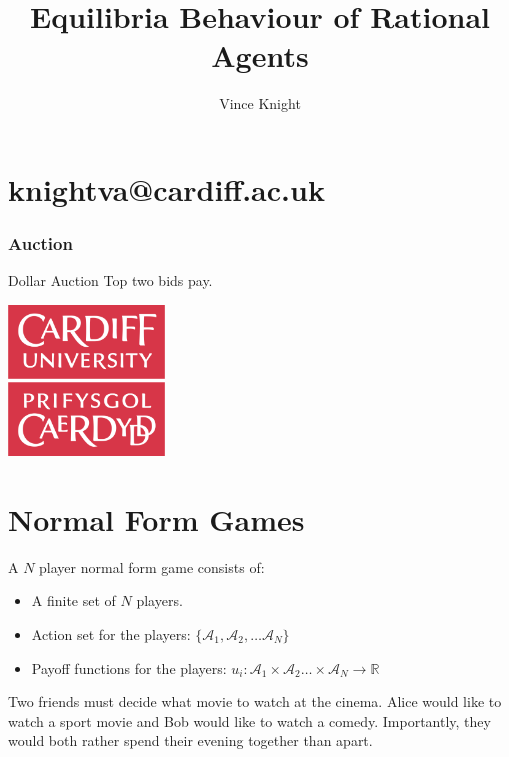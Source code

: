 \documentclass{beamer}              %
\title{Equilibria Behaviour of Rational Agents}
\author{Vince Knight}
\date{}
\begin{document}
\frame{
    \titlepage
}

\section{knightva@cardiff.ac.uk}

\begin{frame}
    \frametitle{Auction}
        \begin{alertblock}{Dollar Auction}
            \centering
                Top two bids pay.
        \end{alertblock}
\end{frame}

\begin{frame}
    \centering

    \includegraphics[height=4cm]{static/CUident_CMYK.png}

\end{frame}

\section{Normal Form Games}

\begin{frame}

    \begin{definition}
        A $N$ player normal form game consists of:

        \begin{itemize}
            \item A finite set of $N$ players.
            \item Action set for the players: $\{\mathcal{A}_1, \mathcal{A}_2, \dots \mathcal{A}_N\}$
            \item Payoff functions for the players: $u_i : \mathcal{A}_1 \times \mathcal{A}_2 \dots \times \mathcal{A}_N \to \mathbb{R}$
        \end{itemize}
    \end{definition}
\end{frame}

\begin{frame}
    \begin{example}
        Two friends must decide what movie to watch at the cinema. Alice would like
        to watch a sport movie and Bob would like to watch a comedy. Importantly,
        they would both rather spend their evening together than apart.
    \end{example}
\end{frame}
\end{document}

